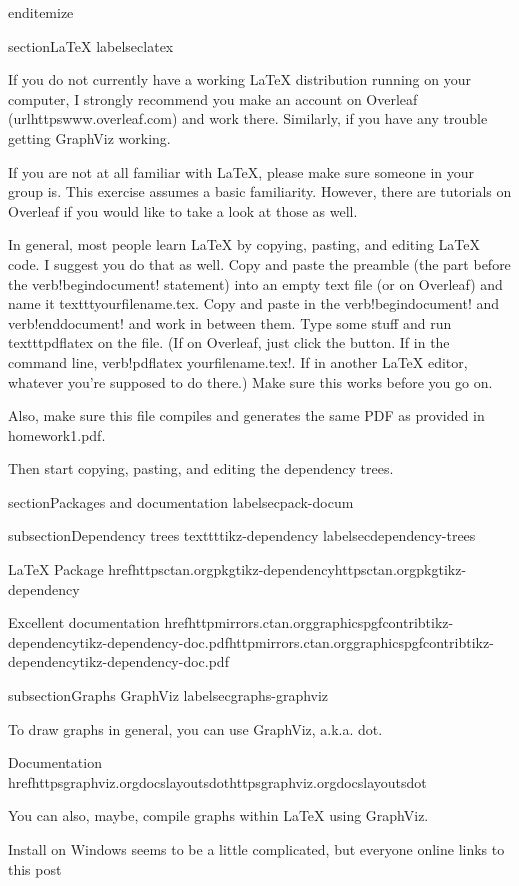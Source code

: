 end{itemize}

section{LaTeX}
label{seclatex}

If you do not currently have a working LaTeX{} distribution running on your computer, I strongly recommend you make an account on Overleaf (url{httpswww.overleaf.com}) and work there. Similarly, if you have any trouble getting GraphViz working.

If you are not at all familiar with LaTeX{}, please make sure someone in your group is. This exercise assumes a basic familiarity. However, there are tutorials on Overleaf if you would like to take a look at those as well.

In general, most people learn LaTeX{} by copying, pasting, and editing LaTeX{} code. I suggest you do that as well. Copy and paste the preamble (the part before the verb!begin{document}! statement) into an empty text file (or on Overleaf) and name it texttt{yourfilename.tex}. Copy and paste in the verb!begin{document}! and verb!end{document}! and work in between them. Type some stuff and run texttt{pdflatex} on the file. (If on Overleaf, just click the button. If in the command line, verb!pdflatex yourfilename.tex!. If in another LaTeX{} editor, whatever you're supposed to do there.) Make sure this works before you go on.

  Also, make sure this file compiles and generates the same PDF as provided in homework1.pdf.

  Then start copying, pasting, and editing the dependency trees.


section{Packages and documentation}
label{secpack-docum}

subsection{Dependency trees texttt{tikz-dependency}}
label{secdependency-trees}


LaTeX{} Package
href{httpsctan.orgpkgtikz-dependency}{httpsctan.orgpkgtikz-dependency}

Excellent documentation href{httpmirrors.ctan.orggraphicspgfcontribtikz-dependencytikz-dependency-doc.pdf}{httpmirrors.ctan.orggraphicspgfcontribtikz-dependencytikz-dependency-doc.pdf}

subsection{Graphs GraphViz}
label{secgraphs-graphviz}

To draw graphs in general, you can use GraphViz, a.k.a. dot.

Documentation
href{httpsgraphviz.orgdocslayoutsdot}{httpsgraphviz.orgdocslayoutsdot}

You can also, maybe, compile graphs within LaTeX using GraphViz.

Install on Windows seems to be a little complicated, but everyone online links to this post


